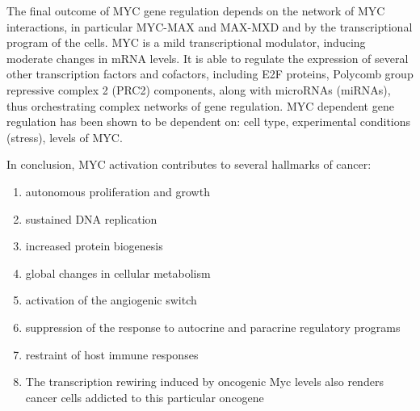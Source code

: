 The final outcome of MYC gene regulation depends on the network of MYC interactions, in particular MYC-MAX
and MAX-MXD and by the transcriptional program of the cells.
MYC is a mild transcriptional modulator, inducing moderate changes in mRNA levels.
It is able to regulate the expression of several other transcription factors and cofactors, including E2F proteins,
Polycomb group repressive complex 2 (PRC2) components, along with microRNAs (miRNAs), thus orchestrating
complex networks of gene regulation.
MYC dependent gene regulation has been shown to be dependent on: cell type, experimental conditions (stress),
levels of MYC.

In conclusion, MYC activation contributes to several hallmarks of cancer:
\begin{enumerate}
\item autonomous proliferation and growth
\item sustained DNA replication
\item increased protein biogenesis
\item global changes in cellular metabolism
\item activation of the angiogenic switch
\item suppression of the response to autocrine and paracrine regulatory programs
\item restraint of host immune responses
\item The transcription rewiring induced by oncogenic Myc levels also renders cancer cells addicted to this particular oncogene
\end{enumerate}
